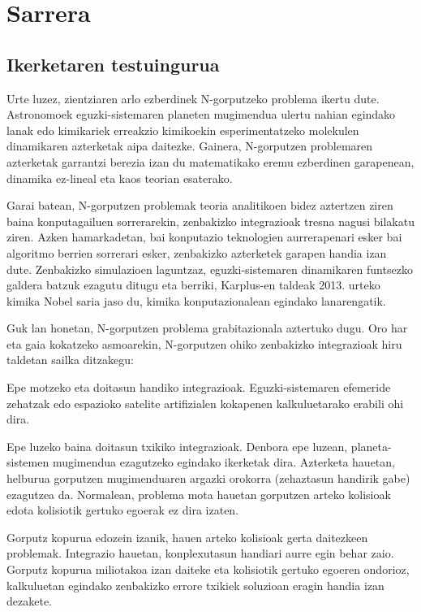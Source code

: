 \chapter{Sarrera}


\section{Ikerketaren testuingurua}

Urte luzez, zientziaren arlo ezberdinek N-gorputzeko problema ikertu dute. Astronomoek eguzki-sistemaren planeten mugimendua ulertu nahian egindako lanak edo kimikariek erreakzio kimikoekin esperimentatzeko molekulen dinamikaren azterketak aipa daitezke. Gainera,  N-gorputzen problemaren azterketak garrantzi berezia izan du matematikako eremu ezberdinen garapenean,  dinamika ez-lineal eta kaos teorian esaterako. 

Garai batean, N-gorputzen problemak teoria analitikoen bidez aztertzen ziren baina konputagailuen sorrerarekin, zenbakizko integrazioak tresna nagusi bilakatu ziren. Azken hamarkadetan, bai konputazio teknologien aurrerapenari esker bai algoritmo berrien sorrerari esker, zenbakizko azterketek garapen handia izan dute. Zenbakizko simulazioen laguntzaz, eguzki-sistemaren dinamikaren funtsezko galdera batzuk ezagutu ditugu eta berriki, Karplus-en taldeak 2013. urteko kimika Nobel saria \cite{Karplus2014} jaso du, kimika konputazionalean egindako lanarengatik.       

Guk lan honetan, N-gorputzen problema grabitazionala aztertuko dugu. Oro har eta gaia kokatzeko asmoarekin, N-gorputzen ohiko zenbakizko  integrazioak hiru taldetan sailka ditzakegu:
\begin{enumerate}
{
\item Epe motzeko eta doitasun handiko integrazioak. 
 Eguzki-sistemaren efemeride zehatzak \cite{Folkner2014} edo espazioko satelite artifizialen kokapenen \cite{Beylkin2014} kalkuluetarako erabili ohi dira.
\item Epe luzeko baina doitasun txikiko integrazioak.
 Denbora epe luzean, planeta-sistemen mugimendua ezagutzeko egindako ikerketak dira. Azterketa hauetan, helburua gorputzen mugimenduaren argazki orokorra (zehaztasun handirik gabe) ezagutzea da. Normalean, problema mota hauetan gorputzen arteko kolisioak edota kolisiotik gertuko egoerak ez dira izaten.     
\item Gorputz kopurua edozein izanik, hauen arteko kolisioak gerta daitezkeen problemak.
 Integrazio hauetan, konplexutasun handiari aurre egin behar zaio. Gorputz kopurua miliotakoa \cite{Ishiyama2012} izan daiteke eta kolisiotik gertuko egoeren ondorioz, kalkuluetan egindako zenbakizko errore txikiek soluzioan eragin handia izan dezakete.    
}
\end{enumerate}

